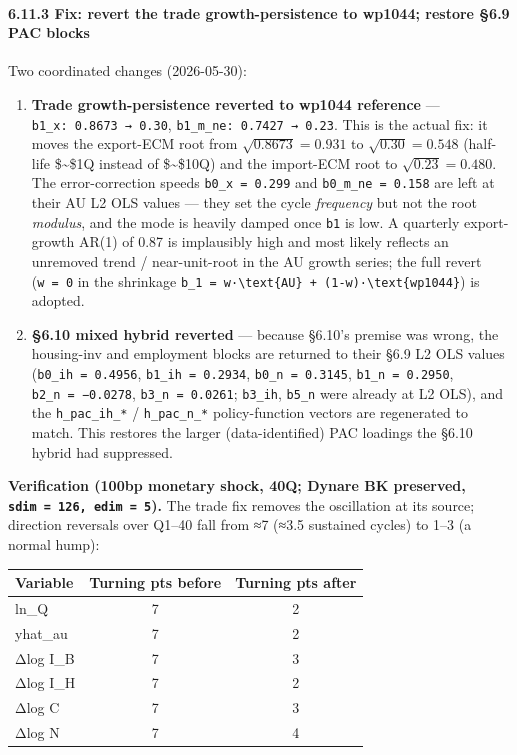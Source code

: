 \documentclass[
]{article}
\newcounter{none} %
\providecommand{\tightlist}{%
  \setlength{\itemsep}{0pt}\setlength{\parskip}{0pt}}
\begin{document}
\paragraph{6.11.3 Fix: revert the trade growth-persistence to wp1044;
restore §6.9 PAC
blocks}\label{fix-revert-the-trade-growth-persistence-to-wp1044-restore-6.9-pac-blocks}

Two coordinated changes (2026-05-30):

\begin{enumerate}
\def\labelenumi{\arabic{enumi}.}
\tightlist
\item
  \textbf{Trade growth-persistence reverted to wp1044 reference} ---
  \texttt{b1\_x:\ 0.8673\ →\ 0.30},
  \texttt{b1\_m\_ne:\ 0.7427\ →\ 0.23}. This is the actual fix: it moves
  the export-ECM root from \(\sqrt{0.8673}=0.931\) to
  \(\sqrt{0.30}=0.548\) (half-life \$\sim\$1Q instead of \$\sim\$10Q)
  and the import-ECM root to \(\sqrt{0.23}=0.480\). The error-correction
  speeds \texttt{b0\_x\ =\ 0.299} and \texttt{b0\_m\_ne\ =\ 0.158} are
  left at their AU L2 OLS values --- they set the cycle \emph{frequency}
  but not the root \emph{modulus}, and the mode is heavily damped once
  \texttt{b1} is low. A quarterly export-growth AR(1) of 0.87 is
  implausibly high and most likely reflects an unremoved trend /
  near-unit-root in the AU growth series; the full revert
  (\texttt{w\ =\ 0} in the shrinkage
  \texttt{b\_1\ =\ w·\textbackslash{}text\{AU\}\ +\ (1-w)·\textbackslash{}text\{wp1044\}})
  is adopted.
\item
  \textbf{§6.10 mixed hybrid reverted} --- because §6.10's premise was
  wrong, the housing-inv and employment blocks are returned to their
  §6.9 L2 OLS values (\texttt{b0\_ih\ =\ 0.4956},
  \texttt{b1\_ih\ =\ 0.2934}, \texttt{b0\_n\ =\ 0.3145},
  \texttt{b1\_n\ =\ 0.2950}, \texttt{b2\_n\ =\ −0.0278},
  \texttt{b3\_n\ =\ 0.0261}; \texttt{b3\_ih}, \texttt{b5\_n} were
  already at L2 OLS), and the \texttt{h\_pac\_ih\_*} /
  \texttt{h\_pac\_n\_*} policy-function vectors are regenerated to
  match. This restores the larger (data-identified) PAC loadings the
  §6.10 hybrid had suppressed.
\end{enumerate}

\textbf{Verification (100bp monetary shock, 40Q; Dynare BK preserved,
\texttt{sdim\ =\ 126,\ edim\ =\ 5}).} The trade fix removes the
oscillation at its source; direction reversals over Q1--40 fall from ≈7
(≈3.5 sustained cycles) to 1--3 (a normal hump):

{\def\LTcaptype{none} %
\begin{longtable}[]{@{}lcc@{}}
\toprule\noalign{}
Variable & Turning pts before & Turning pts after \\
\midrule\noalign{}
\endhead
\bottomrule\noalign{}
\endlastfoot
ln\_Q & 7 & 2 \\
yhat\_au & 7 & 2 \\
Δlog I\_B & 7 & 3 \\
Δlog I\_H & 7 & 2 \\
Δlog C & 7 & 3 \\
Δlog N & 7 & 4 \\
\end{longtable}
}
\end{document}
